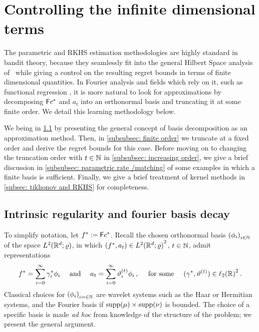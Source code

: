 

\section{Controlling the infinite dimensional terms}\label{app: computation}



The parametric and RKHS estimation methodologies are highly standard in bandit theory, because they seamlessly fit into the general Hilbert Space analysis of~\cite{abbasi-yadkori_online_2012} while giving a control on the resulting regret bounds in terms of finite dimensional quantities. In Fourier analysis and fields which rely on it, such as functional regression \citep{morris_functional_2015}, it is more natural to look for approximations by decomposing $\mathsf{F} c^*$ and $a_t$ into an orthonormal basis and truncating it at some finite order. We detail this learning methodology below.

We being in \cref{subsec: Fourier basis representation} by presenting the general concept of basis decomposition as an approximation method. Then, in \cref{subsubsec: finite order} we truncate at a fixed order and derive the regret bounds for this case. Before moving on to changing the truncation order with $t\in\mathbb{N}$ in \cref{subsubsec: increasing order}, we give a brief discussion in \cref{subsubsec: parametric rate /matching} of some examples in which a finite basis is sufficient. Finally, we give a brief treatment of kernel methods in \cref{subsec: tikhonov and RKHS} for completeness.



\subsection{Intrinsic regularity and fourier basis decay}\label{subsec: Fourier basis representation}

To simplify notation, let $f^*:=\mathsf{F} c^*$. Recall the chosen orthonormal basis ${(\phi_i)}_{i\in\mathbb{N}}$ of the space $L^2(\mathbb{R}^d;\varrho)$, in which $(f^*,a_t)\in {L^2(\mathbb{R}^d;\varrho)}^2$, $t\in\mathbb{N}$, admit representations 
\[
    f^*= \sum_{i=0}^\infty \gamma_i^*\phi_i\quad\mbox{ and }\quad a_t = \sum_{i=0}^\infty \vartheta^{(t)}_{i}\phi_i\,, \quad \mbox{ for some }\quad (\gamma^*,\vartheta^{(t)})\in{\ell_2(\mathbb{R})}^2\,.
\] 
Classical choices for ${(\phi_i)}_{i=\in\mathbb{N}}$ are wavelet systems such as the Haar or Hermitian systems, and the Fourier basis if $\text{supp}(\mu)\times\text{supp}(\nu)$ is bounded. The choice of a specific basis is made \textit{ad hoc} from knowledge of the structure of the problem; we present the general argument. 

